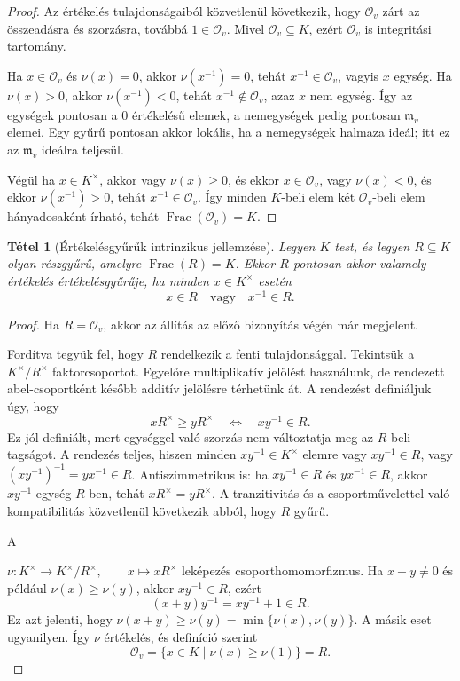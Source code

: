 \documentclass[11pt,a4paper]{article}
\newtheorem{tetel}{Tétel}[section]
\theoremstyle{definition}
\DeclareMathOperator{\Frac}{Frac}
\newcommand{\OO}{\mathcal O}
\newcommand{\mm}{\mathfrak m}
\begin{document}
\begin{proof}
Az értékelés tulajdonságaiból közvetlenül következik, hogy $\OO_v$
zárt az összeadásra és szorzásra, továbbá $1\in\OO_v$. Mivel
$\OO_v\subseteq K$, ezért $\OO_v$ is integritási tartomány.

Ha $x\in\OO_v$ és $
\nu(x)=0$, akkor $
\nu(x^{-1})=0$, tehát
$x^{-1}\in\OO_v$, vagyis $x$ egység. Ha $
\nu(x)>0$, akkor
$
\nu(x^{-1})<0$, tehát $x^{-1}\notin\OO_v$, azaz $x$ nem egység.
Így az egységek pontosan a
$0$ értékelésű elemek, a nemegységek pedig pontosan $\mm_v$ elemei. Egy
gyűrű pontosan akkor lokális, ha a nemegységek halmaza ideál; itt ez
az $\mm_v$ ideálra teljesül.

Végül ha $x\in K^\times$, akkor vagy $
\nu(x)\geq 0$, és ekkor
$x\in\OO_v$, vagy $
\nu(x)<0$, és ekkor $
\nu(x^{-1})>0$, tehát
$x^{-1}\in\OO_v$. Így minden $K$-beli elem két $\OO_v$-beli elem
hányadosaként írható, tehát $\Frac(\OO_v)=K$.
\end{proof}

\begin{tetel}[Értékelésgyűrűk intrinzikus jellemzése]
Legyen $K$ test, és legyen $R\subseteq K$ olyan részgyűrű, amelyre
$\Frac(R)=K$. Ekkor $R$ pontosan akkor valamely értékelés
értékelésgyűrűje, ha minden $x\in K^\times$ esetén
\[
  x\in R \quad\text{vagy}\quad x^{-1}\in R.
\]
\end{tetel}

\begin{proof}
Ha $R=\OO_v$, akkor az állítás az előző bizonyítás végén már
megjelent.

Fordítva tegyük fel, hogy $R$ rendelkezik a fenti tulajdonsággal.
Tekintsük a $K^\times/R^\times$ faktorcsoportot. Egyelőre
multiplikatív jelölést használunk, de rendezett abel-csoportként
később additív jelölésre térhetünk át. A rendezést definiáljuk úgy,
hogy
\[
  xR^\times\geq yR^\times
  \quad\Longleftrightarrow\quad
  xy^{-1}\in R.
\]
Ez jól definiált, mert egységgel való szorzás nem változtatja meg az
$R$-beli tagságot. A rendezés teljes, hiszen minden
$xy^{-1}\in K^\times$ elemre vagy $xy^{-1}\in R$, vagy
$(xy^{-1})^{-1}=yx^{-1}\in R$. Antiszimmetrikus is: ha
$xy^{-1}\in R$ és $yx^{-1}\in R$, akkor $xy^{-1}$ egység $R$-ben,
tehát $xR^\times=yR^\times$. A tranzitivitás és a csoportművelettel
való kompatibilitás közvetlenül következik abból, hogy $R$ gyűrű.

A

  $
\nu:K^\times\longrightarrow K^\times/R^\times,\qquad
  x\longmapsto xR^\times
$
leképezés csoporthomomorfizmus. Ha $x+y\neq 0$ és például
$
\nu(x)\geq 
\nu(y)$, akkor $xy^{-1}\in R$, ezért
\[
  (x+y)y^{-1}=xy^{-1}+1\in R.
\]
Ez azt jelenti, hogy $
\nu(x+y)\geq 
\nu(y)=\min\{
\nu(x),
\nu(y)\}$. A másik
eset ugyanilyen. Így $
\nu$ értékelés, és definíció szerint
\[
  \OO_v=\{x\in K\mid 
\nu(x)\geq 
\nu(1)\}=R.
\]
\end{proof}
\end{document}
